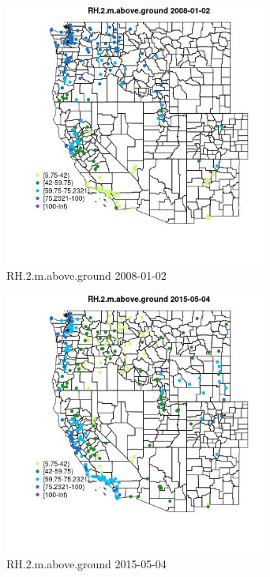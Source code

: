 \begin{figure} 
\centering  
\includegraphics[width=0.77\textwidth]{Code_Outputs/Report_ML_input_PM25_Step4_part_e_de_duplicated_aves_compiled_2019-05-18wNAs_MapObsRH2maboveground2008-01-02.jpg} 
\caption{\label{fig:Report_ML_input_PM25_Step4_part_e_de_duplicated_aves_compiled_2019-05-18wNAsMapObsRH2maboveground2008-01-02}RH.2.m.above.ground 2008-01-02} 
\end{figure} 
 

\clearpage 

\begin{figure} 
\centering  
\includegraphics[width=0.77\textwidth]{Code_Outputs/Report_ML_input_PM25_Step4_part_e_de_duplicated_aves_compiled_2019-05-18wNAs_MapObsRH2maboveground2015-05-04.jpg} 
\caption{\label{fig:Report_ML_input_PM25_Step4_part_e_de_duplicated_aves_compiled_2019-05-18wNAsMapObsRH2maboveground2015-05-04}RH.2.m.above.ground 2015-05-04} 
\end{figure} 
 

